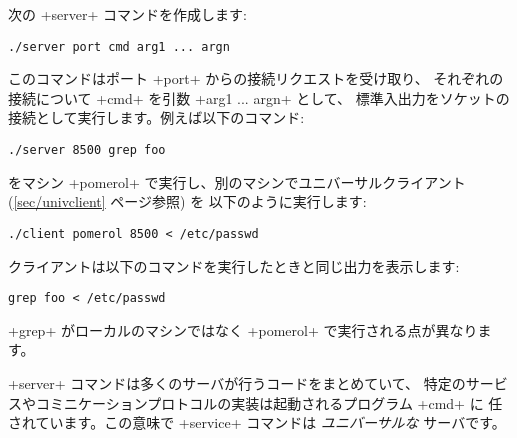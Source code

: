 次の \ml+server+ コマンドを作成します:
%
\begin{lstlisting}
./server port cmd arg1 ... argn
\end{lstlisting}
%
このコマンドはポート \ml+port+ からの接続リクエストを受け取り、
それぞれの接続について \ml+cmd+ を引数 \ml+arg1 ... argn+ として、
標準入出力をソケットの接続として実行します。例えば以下のコマンド:
%
\begin{lstlisting}
./server 8500 grep foo
\end{lstlisting}
%
をマシン \ml+pomerol+ で実行し、別のマシンでユニバーサルクライアント (\ref{sec/univclient} ページ参照) を
以下のように実行します:
%
\begin{lstlisting}
./client pomerol 8500 < /etc/passwd
\end{lstlisting}
%
クライアントは以下のコマンドを実行したときと同じ出力を表示します:
%
\begin{lstlisting}
grep foo < /etc/passwd
\end{lstlisting}
%
\ml+grep+ がローカルのマシンではなく \ml+pomerol+ で実行される点が異なります。

\ml+server+ コマンドは多くのサーバが行うコードをまとめていて、
特定のサービスやコミニケーションプロトコルの実装は起動されるプログラム \ml+cmd+ に
任されています。この意味で \ml+service+ コマンドは \emph{ユニバーサルな} サーバです。

